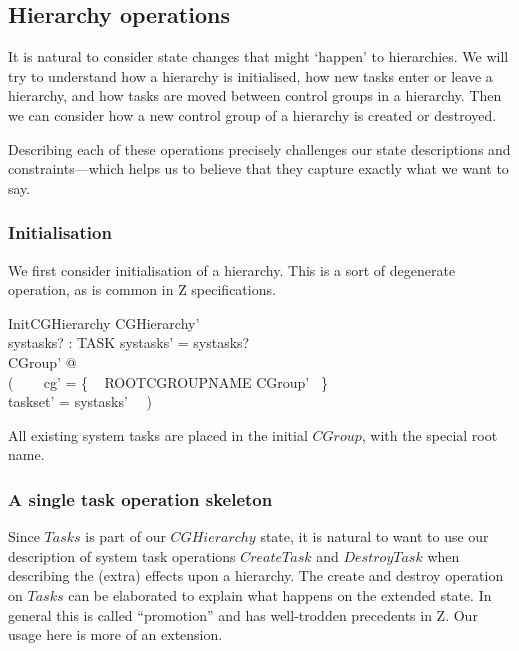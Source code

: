 \documentclass[a4paper,twoside,12pt]{article}
\begin{document}
\subsection{Hierarchy operations}

It is natural to consider state changes that might `happen' to hierarchies.
We will try to understand how a hierarchy is initialised, how new tasks enter or leave a hierarchy,
and how tasks are moved between control groups in a hierarchy.
Then we can consider how a new control group of a hierarchy is created or destroyed.

Describing each of these operations precisely challenges our state descriptions and constraints---which helps us
to believe that they capture exactly what we want to say.

\subsubsection{Initialisation}

We first consider initialisation of a hierarchy. This is a sort of degenerate operation, as is common in Z specifications.

\begin{schema}{InitCGHierarchy}
CGHierarchy' \\
systasks? : \finset TASK
\where
systasks' = systasks? \\
\exists CGroup' @ \\
( ~~~ cg' = \{ ~ ROOTCGROUPNAME \mapsto \theta CGroup' ~\} \\
\land taskset' = systasks' ~~)
\end{schema}
All existing system tasks are placed in the initial $CGroup$,
with the special root name.

\subsubsection{A single task operation skeleton}

Since $Tasks$ is part of our $CGHierarchy$ state, it is natural to want to use our description of system task operations $CreateTask$
and $DestroyTask$ when describing the (extra) effects upon a hierarchy. The create and destroy operation on
$Tasks$ can be elaborated to explain what happens on the extended state.
In general this is called ``promotion'' and has well-trodden precedents in Z. Our usage here is more of an extension.
\end{document}
